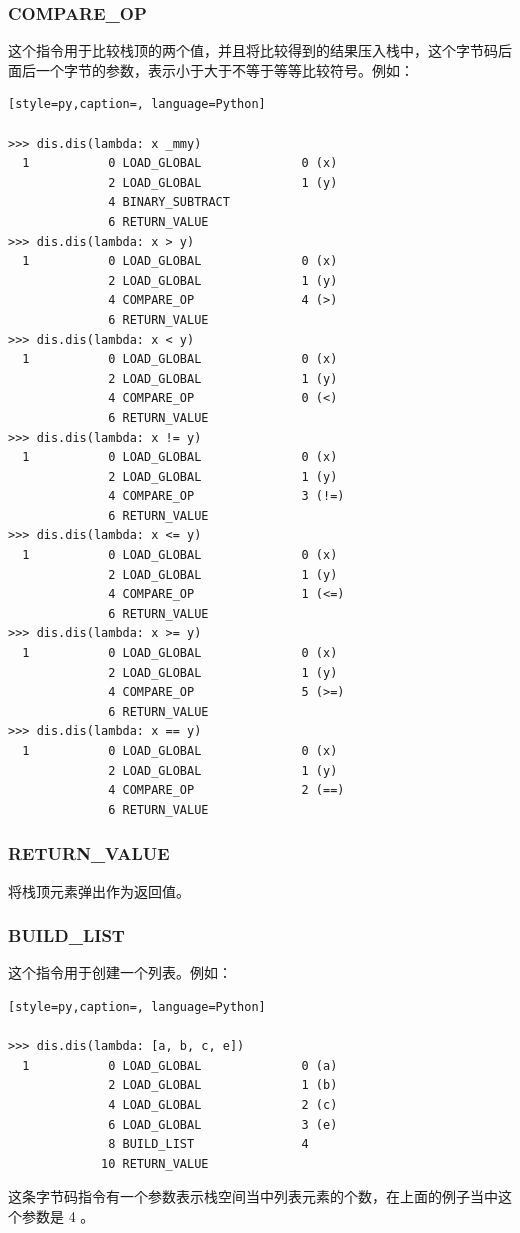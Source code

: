 \subsubsection{COMPARE\_OP}
这个指令用于比较栈顶的两个值，并且将比较得到的结果压入栈中，这个字节码后面后一个字节的参数，表示小于大于不等于等等比较符号。例如：
\begin{lstlisting}[style=py,caption=, language=Python]

>>> dis.dis(lambda: x _mmy) 
  1           0 LOAD_GLOBAL              0 (x)
              2 LOAD_GLOBAL              1 (y)
              4 BINARY_SUBTRACT
              6 RETURN_VALUE
>>> dis.dis(lambda: x > y)
  1           0 LOAD_GLOBAL              0 (x)
              2 LOAD_GLOBAL              1 (y)
              4 COMPARE_OP               4 (>)
              6 RETURN_VALUE
>>> dis.dis(lambda: x < y)
  1           0 LOAD_GLOBAL              0 (x)
              2 LOAD_GLOBAL              1 (y)
              4 COMPARE_OP               0 (<)
              6 RETURN_VALUE
>>> dis.dis(lambda: x != y)
  1           0 LOAD_GLOBAL              0 (x)
              2 LOAD_GLOBAL              1 (y)
              4 COMPARE_OP               3 (!=)
              6 RETURN_VALUE
>>> dis.dis(lambda: x <= y)
  1           0 LOAD_GLOBAL              0 (x)
              2 LOAD_GLOBAL              1 (y)
              4 COMPARE_OP               1 (<=)
              6 RETURN_VALUE
>>> dis.dis(lambda: x >= y)
  1           0 LOAD_GLOBAL              0 (x)
              2 LOAD_GLOBAL              1 (y)
              4 COMPARE_OP               5 (>=)
              6 RETURN_VALUE
>>> dis.dis(lambda: x == y)
  1           0 LOAD_GLOBAL              0 (x)
              2 LOAD_GLOBAL              1 (y)
              4 COMPARE_OP               2 (==)
              6 RETURN_VALUE
\end{lstlisting}
\subsubsection{RETURN\_VALUE}
将栈顶元素弹出作为返回值。
\subsubsection{BUILD\_LIST}
这个指令用于创建一个列表。例如：
\begin{lstlisting}[style=py,caption=, language=Python]

>>> dis.dis(lambda: [a, b, c, e])
  1           0 LOAD_GLOBAL              0 (a)
              2 LOAD_GLOBAL              1 (b)
              4 LOAD_GLOBAL              2 (c)
              6 LOAD_GLOBAL              3 (e)
              8 BUILD_LIST               4
             10 RETURN_VALUE
\end{lstlisting}
这条字节码指令有一个参数表示栈空间当中列表元素的个数，在上面的例子当中这个参数是 4 。
